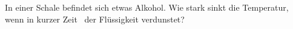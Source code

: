 In einer Schale befindet sich etwas Alkohol. Wie stark sinkt die Temperatur, wenn in kurzer Zeit \fvO\ der Flüssigkeit verdunstet?
